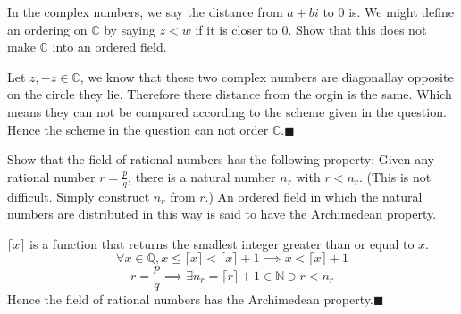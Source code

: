 \documentclass[addpoints]{exam}
\theoremstyle{mytheoremstyle}
\theoremstyle{mytheoremstyle}
\theoremstyle{myproblemstyle}
\begin{document}
\begin{questions}


    \question[1] In the complex numbers, we say the distance from \(a + bi\) to 0 is. We might define an ordering on \(\mathbb{C}\) by saying \(z < w\) if it is closer to 0. Show that this does not make \(\mathbb{C}\) into an ordered field.
    \begin{solution}
        Let \(z,-z\in\mathbb{C}\), we know that these two complex numbers are diagonallay opposite on the circle they lie. Therefore there distance from the orgin is the same. Which means they can not be compared according to the scheme given in the question. Hence the scheme in the question can not order \(\mathbb{C}\).\hfill\(\blacksquare\)
    \end{solution}

    \question[1] Show that the field of rational numbers has the following property: Given any rational number \(r = \frac{p}{q}\), there is a natural number \(n_r\) with \(r < n_r\). (This is not difficult. Simply construct \(n_r\) from \(r\).) An ordered field in which the natural numbers are distributed in this way is said to have the Archimedean property.
    \begin{solution}
        \(\lceil x\rceil\) is a function that returns the smallest integer greater than or equal to \(x\).
        \[\forall x\in\mathbb{Q}, x\le\lceil x\rceil < \lceil x\rceil+1\implies x< \lceil x\rceil+1\]
        \[r = \frac{p}{q}\implies \exists n_r=\lceil r\rceil + 1\in\mathbb{N}\ni r<n_r\]
        Hence the field of rational numbers has the Archimedean property.\hfill\(\blacksquare\)
    \end{solution}


\end{questions}
\end{document}
